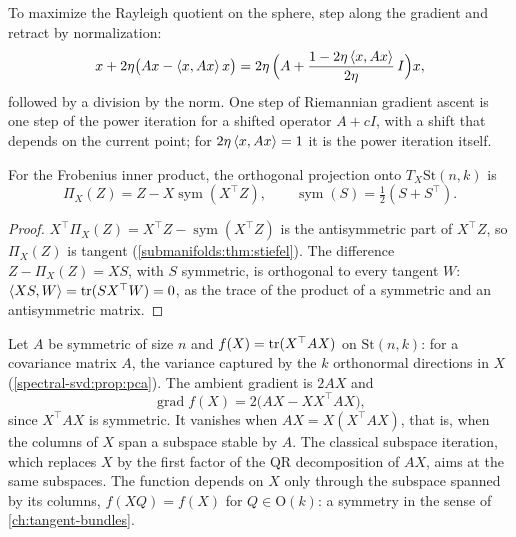 \begin{notechapter}
\begin{example}
\label{riemannian-optimization:ex:power}
To maximize the Rayleigh quotient on the sphere, step along the gradient
and retract by normalization:
\[
  x + 2\eta\bigl(Ax - \left\langle x, Ax \right\rangle x\bigr)
  = 2\eta\,\Bigl(A + \frac{1 - 2\eta\left\langle x, Ax \right\rangle}{2\eta}\,I\Bigr)x ,
\]
followed by a division by the norm. One step of Riemannian gradient
ascent is one step of the power iteration for a shifted operator
$A + cI$, with a shift that depends on the current point; for
$2\eta\left\langle x, Ax \right\rangle = 1$ it is the power iteration itself.
\end{example}

\begin{proposition}
\label{riemannian-optimization:prop:stiefel}
For the Frobenius inner product, the orthogonal projection onto
$T_X\mathrm{St}(n, k)$ is
\[
  \Pi_X(Z) = Z - X\operatorname{sym}(X^\top Z) , \qquad
  \operatorname{sym}(S) = \tfrac12(S + S^\top) .
\]
\end{proposition}

\begin{proof}
$X^\top\Pi_X(Z) = X^\top Z - \operatorname{sym}(X^\top Z)$ is the
antisymmetric part of $X^\top Z$, so $\Pi_X(Z)$ is tangent
(\cref{submanifolds:thm:stiefel}). The difference $Z - \Pi_X(Z) = XS$,
with $S$ symmetric, is orthogonal to every tangent $W$:
$\left\langle XS, W \right\rangle = \operatorname{tr}(SX^\top W) = 0$, as the trace of the product of a
symmetric and an antisymmetric matrix.
\end{proof}

\begin{example}\label{riemannian-optimization:ex:pca}
Let $A$ be symmetric of size $n$ and $f(X) = \operatorname{tr}(X^\top AX)$ on
$\mathrm{St}(n, k)$: for a covariance matrix $A$, the variance captured
by the $k$ orthonormal directions in $X$
(\cref{spectral-svd:prop:pca}). The ambient gradient is $2AX$ and
\[
  \operatorname{grad}f(X) = 2\bigl(AX - XX^\top AX\bigr) ,
\]
since $X^\top AX$ is symmetric. It vanishes when $AX = X(X^\top AX)$,
that is, when the columns of $X$ span a subspace stable by $A$.
The classical subspace iteration, which replaces $X$ by the first factor
of the QR decomposition of $AX$, aims at the same subspaces. The
function depends on $X$ only
through the subspace spanned by its columns, $f(XQ) = f(X)$ for
$Q\in\mathrm O(k)$: a symmetry in the sense of \cref{ch:tangent-bundles}.
\end{example}


\end{notechapter}
